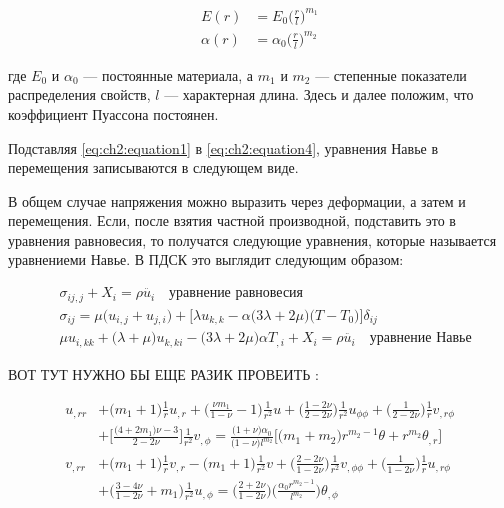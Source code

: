 \begin{equation}
	\label{eq:ch2:equation4}
	\begin{split}
		E(r) &= E_0 \big ( \frac{r}{l} \big) ^ {m_1} \\
		\alpha (r) &= \alpha_0 \big ( \frac{r}{l} \big) ^{ m_2}
	\end{split}
\end{equation}

где \(E_0\) и \(\alpha_0 \) --- постоянные материала, а \(m_1\) и \(m_2\) --- степенные показатели распределения свойств, \(l\) --- характерная длина. Здесь и далее положим,
что коэффициент Пуассона постоянен.

Подставляя \cref{eq:ch2:equation1} в \cref{eq:ch2:equation4}, уравнения Навье в перемещения записываются в следующем виде.
\begin{adjustwidth}{3.5em}{3.5em} В общем случае напряжения можно выразить через деформации, а затем и перемещения. Если, после взятия частной производной, подставить это в уравнения равновесия, то получатся следующие уравнения, которые называется уравнениеми Навье. В ПДСК это выглядит следующим образом:

\begin{equation*}
\begin{split}
	&\sigma_{ij,j} + X_i = \rho \ddot{u_i} \quad \text{уравнение равновесия} \\
	&\sigma_{ij} = \mu \big (u_{i,j} + u_{j,i} \big ) + \big [ \lambda u_{k,k} - \alpha \big (3 \lambda +2\mu \big ) \big (T-T_0 \big ) \big ] \delta_{ij}\\
	&\mu u_{i,kk} + \big ( \lambda + \mu \big ) u_{k,ki} - \big ( 3 \lambda + 2\mu \big ) \alpha T_{,i} +X_i = \rho \ddot{u_i} \quad \text{уравнение Навье}
\end{split}
\end{equation*}
\end{adjustwidth}


{\color{red} ВОТ ТУТ НУЖНО БЫ ЕЩЕ РАЗИК ПРОВЕИТЬ :

\begin{equation}
	\label{eq:ch2:equation5}
	\begin{split}
		u_{,rr} &+ \big ( m_1+1\big ) \frac{1}{r} u_{,r} + \big ( \frac{\nu m_1}{1-\nu} -1 \big ) \frac{1}{r^2} u + \big ( \frac{1-2\nu}{2-2\nu} \big) \frac{1}{r^2} u_{\phi \phi} + \big ( \frac{1}{2-2\nu}\big ) \frac{1}{r} v_{,r \phi} \\
		&+ \big [ \frac{\big ( 4+2 m_1\big ) \nu -3 }{2-2\nu} \big ] \frac{1}{r^2} v_{, \phi} = \frac{\big ( 1+\nu\big ) \alpha_0 }{\big (1-\nu \big ) l^{m_2}} \Big [ \big (m_1 + m_2 \big ) r^{m_2 -1} \theta + r^{m_2} \theta_{,r}\Big] \\
		v_{,rr} &+ \big (m_1 +1 \big ) \frac{1}{r} v_{,r} - \big (m_1 + 1 \big ) \frac{1}{r^2} v + \big ( \frac{2-2\nu }{1-2\nu } \big ) \frac{1}{r^2} v_{,\phi \phi} + \big ( \frac{1}{1-2\nu} \big ) \frac{1}{r} u_{,r \phi} \\
		&+ \big ( \frac{3-4\nu}{1-2\nu} + m_1\big ) \frac{1}{r^2} u_{, \phi} = \big (\frac{2+2\nu}{1-2\nu} \big ) \big (\frac{\alpha_0 r^{m_2 -1}}{l^{m_2}} \big ) \theta_{,\phi}
	\end{split}
\end{equation}
}


